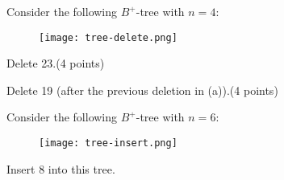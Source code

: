 \documentclass[a4 paper]{article}
\begin{document}
Consider the following $B^{+}$-tree with $n = 4$:
\begin{figure}[h]
\texttt{[image: tree-delete.png]}
\end{figure}

 Delete 23.\indent \indent (4 points)

 Delete 19 (after the previous deletion in (a)).\indent \indent (4 points)

Consider the following $B^{+}$-tree with $n = 6$:
\begin{figure}[h]
\texttt{[image: tree-insert.png]}
\end{figure}
Insert 8 into this tree.
\end{document}
